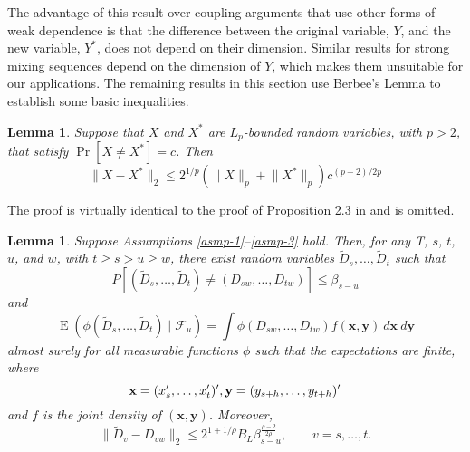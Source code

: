 \documentclass[11pt]{article}
\newtheorem{lem}[thm]{Lemma}
\DeclareMathOperator{\E}{E}
\newcommand{\h}{h}
\newcommand{\rhoExp}{\ensuremath{\frac{\rho-2}{2\rho}}}
\begin{document}
The advantage of this result over coupling arguments that use other
forms of weak dependence is that the difference between the original
variable, $Y$, and the new variable, $Y^{*}$, does not depend on their
dimension.  Similar results for strong mixing sequences depend on the
dimension of $Y$, which makes them unsuitable for our applications.
The remaining results in this section use Berbee's Lemma to establish
some basic inequalities.

\begin{lem}\label{lem-extend-mp}
  Suppose that $X$ and $X^*$ are $L_p$-bounded random variables, with
  $p > 2$, that satisfy ${\Pr[X \neq X^*] = c}$.  Then
  \[
    \lVert X - X^* \rVert_2 \leq 2^{1/p} (\lVert X \rVert_p + \lVert
    X^* \rVert_p) c^{(p-2)/2p}
  \]
\end{lem}

The proof is virtually identical to the proof of Proposition 2.3 in
\citet{merlevede_coupling_2002} and is omitted.

\begin{lem}\label{lem-basic-coupling}
  Suppose Assumptions \ref{asmp-1}--\ref{asmp-3} hold.  Then, for any
  T, $s$, $t$, $u$, and $w$, with $t \geq s > u \geq w$, there exist random
  variables $\tilde D_s,\dots,\tilde D_t$ such that
  \begin{equation}\label{eq:coupling1}
    P[(\tilde D_s,\dots,\tilde D_t) \neq (D_{sw},\dots,D_{tw})] \leq \beta_{s-u}
  \end{equation}
  and
  \begin{equation}\label{eq:coupling2}
    \E(\phi(\tilde D_s,\dots, \tilde D_t) \mid \mathcal{F}_u ) = 
    \int
    \phi(D_{sw},\dots,D_{tw}) f(\mathbf{x}, \mathbf{y})\ d\mathbf{x}\ d\mathbf{y}
  \end{equation}
  almost surely for all measurable functions $\phi$ such that the
  expectations are finite, where 
  \[ \mathbf{x} = (x_{s}', \dots, x_{t}')', \\
  \mathbf{y} = (y_{s+\h},\dots,y_{t+\h})'\] and $f$ is the
  joint density of $(\mathbf{x}, \mathbf{y})$.  Moreover,
 \begin{equation}\label{eq:coupling3}
   \| \tilde D_v - D_{vw} \|_2 \leq 2^{1+1/\rho} B_L
   \beta_{s-u}^\rhoExp, \qquad v = s,\dots,t.
 \end{equation}
\end{lem}
\end{document}
